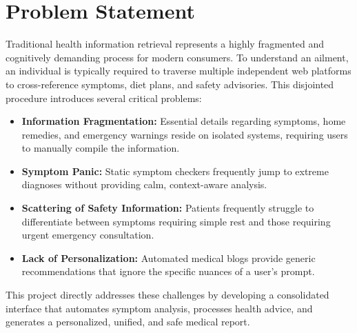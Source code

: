\documentclass[12pt,a4paper]{report}
\begin{document}
\section{Problem Statement}
Traditional health information retrieval represents a highly fragmented and cognitively demanding process for modern consumers. To understand an ailment, an individual is typically required to traverse multiple independent web platforms to cross-reference symptoms, diet plans, and safety advisories. This disjointed procedure introduces several critical problems:
\begin{itemize}
    \item \textbf{Information Fragmentation:} Essential details regarding symptoms, home remedies, and emergency warnings reside on isolated systems, requiring users to manually compile the information.
    \item \textbf{Symptom Panic:} Static symptom checkers frequently jump to extreme diagnoses without providing calm, context-aware analysis.
    \item \textbf{Scattering of Safety Information:} Patients frequently struggle to differentiate between symptoms requiring simple rest and those requiring urgent emergency consultation.
    \item \textbf{Lack of Personalization:} Automated medical blogs provide generic recommendations that ignore the specific nuances of a user's prompt.
\end{itemize}
This project directly addresses these challenges by developing a consolidated interface that automates symptom analysis, processes health advice, and generates a personalized, unified, and safe medical report.
\end{document}
